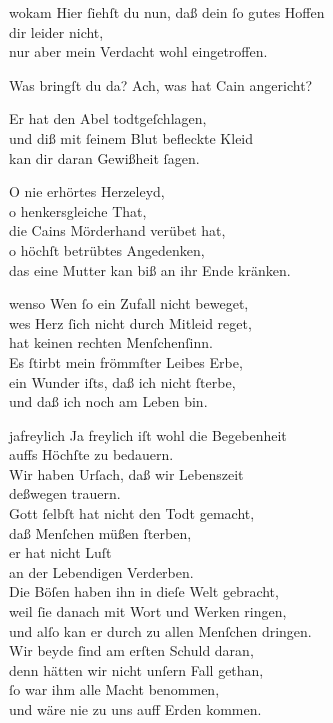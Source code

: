 \documentclass[abbrwidth=6em,tocstyle=ref-genre]{ees}
\begin{document}
{\begin{movement}{wokam}
  \voice[Adam]
  Hier ſiehſt du nun, daß dein ſo gutes Hoffen\\
  dir leider nicht,\\
  nur aber mein Verdacht wohl eingetroffen.

  \voice[Eva]
  Was bringſt du da? Ach, was hat Cain angericht?

  \voice[Adam]
  Er hat den Abel todtgeſchlagen,\\
  und diß mit ſeinem Blut befleckte Kleid\\
  kan dir daran Gewißheit ſagen.

  \voice[Eva]
  O nie erhörtes Herzeleyd,\\
  o henkersgleiche That,\\
  die Cains Mörderhand verübet hat,\\
  o höchſt betrübtes Angedenken,\\
  das eine Mutter kan biß an ihr Ende kränken.
\end{movement}

\begin{movement}{wenso}
  \voice[Eva]
  Wen ſo ein Zufall nicht beweget,\\
  wes Herz ſich nicht durch Mitleid reget,\\
  hat keinen rechten Menſchenſinn.\\
  Es ſtirbt mein frömmſter Leibes Erbe,\\
  ein Wunder iſts, daß ich nicht ſterbe,\\
  und daß ich noch am Leben bin.
\end{movement}

\begin{movement}{jafreylich}
  \voice[Adam]
  Ja freylich iſt wohl die Begebenheit\\
  auffs Höchſte zu bedauern.\\
  Wir haben Urſach, daß wir Lebenszeit\\
  deßwegen trauern.\\
  Gott ſelbſt hat nicht den Todt gemacht,\\
  daß Menſchen müßen ſterben,\\
  er hat nicht Luſt\\
  an der Lebendigen Verderben.\\
  Die Böſen haben ihn in dieſe Welt gebracht,\\
  weil ſie danach mit Wort und Werken ringen,\\
  und alſo kan er durch zu allen Menſchen dringen.\\
  Wir beyde ſind am erſten Schuld daran,\\
  denn hätten wir nicht unſern Fall gethan,\\
  ſo war ihm alle Macht benommen,\\
  und wäre nie zu uns auff Erden kommen.


\end{movement}}
\end{document}
